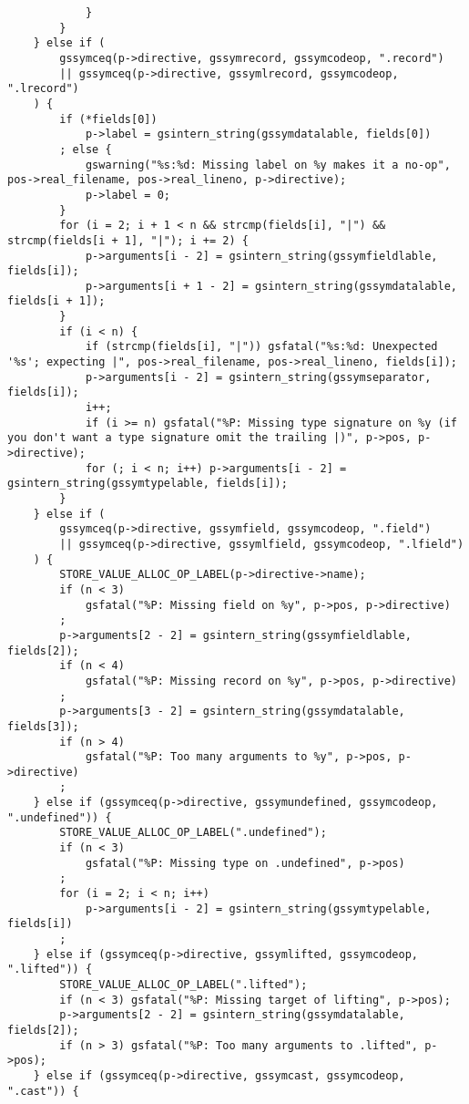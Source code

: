 \documentclass{report}
\begin{document}
\begin{verbatim}
            }
        }
    } else if (
        gssymceq(p->directive, gssymrecord, gssymcodeop, ".record")
        || gssymceq(p->directive, gssymlrecord, gssymcodeop, ".lrecord")
    ) {
        if (*fields[0])
            p->label = gsintern_string(gssymdatalable, fields[0])
        ; else {
            gswarning("%s:%d: Missing label on %y makes it a no-op", pos->real_filename, pos->real_lineno, p->directive);
            p->label = 0;
        }
        for (i = 2; i + 1 < n && strcmp(fields[i], "|") && strcmp(fields[i + 1], "|"); i += 2) {
            p->arguments[i - 2] = gsintern_string(gssymfieldlable, fields[i]);
            p->arguments[i + 1 - 2] = gsintern_string(gssymdatalable, fields[i + 1]);
        }
        if (i < n) {
            if (strcmp(fields[i], "|")) gsfatal("%s:%d: Unexpected '%s'; expecting |", pos->real_filename, pos->real_lineno, fields[i]);
            p->arguments[i - 2] = gsintern_string(gssymseparator, fields[i]);
            i++;
            if (i >= n) gsfatal("%P: Missing type signature on %y (if you don't want a type signature omit the trailing |)", p->pos, p->directive);
            for (; i < n; i++) p->arguments[i - 2] = gsintern_string(gssymtypelable, fields[i]);
        }
    } else if (
        gssymceq(p->directive, gssymfield, gssymcodeop, ".field")
        || gssymceq(p->directive, gssymlfield, gssymcodeop, ".lfield")
    ) {
        STORE_VALUE_ALLOC_OP_LABEL(p->directive->name);
        if (n < 3)
            gsfatal("%P: Missing field on %y", p->pos, p->directive)
        ;
        p->arguments[2 - 2] = gsintern_string(gssymfieldlable, fields[2]);
        if (n < 4)
            gsfatal("%P: Missing record on %y", p->pos, p->directive)
        ;
        p->arguments[3 - 2] = gsintern_string(gssymdatalable, fields[3]);
        if (n > 4)
            gsfatal("%P: Too many arguments to %y", p->pos, p->directive)
        ;
    } else if (gssymceq(p->directive, gssymundefined, gssymcodeop, ".undefined")) {
        STORE_VALUE_ALLOC_OP_LABEL(".undefined");
        if (n < 3)
            gsfatal("%P: Missing type on .undefined", p->pos)
        ;
        for (i = 2; i < n; i++)
            p->arguments[i - 2] = gsintern_string(gssymtypelable, fields[i])
        ;
    } else if (gssymceq(p->directive, gssymlifted, gssymcodeop, ".lifted")) {
        STORE_VALUE_ALLOC_OP_LABEL(".lifted");
        if (n < 3) gsfatal("%P: Missing target of lifting", p->pos);
        p->arguments[2 - 2] = gsintern_string(gssymdatalable, fields[2]);
        if (n > 3) gsfatal("%P: Too many arguments to .lifted", p->pos);
    } else if (gssymceq(p->directive, gssymcast, gssymcodeop, ".cast")) {

\end{verbatim}
\end{document}
